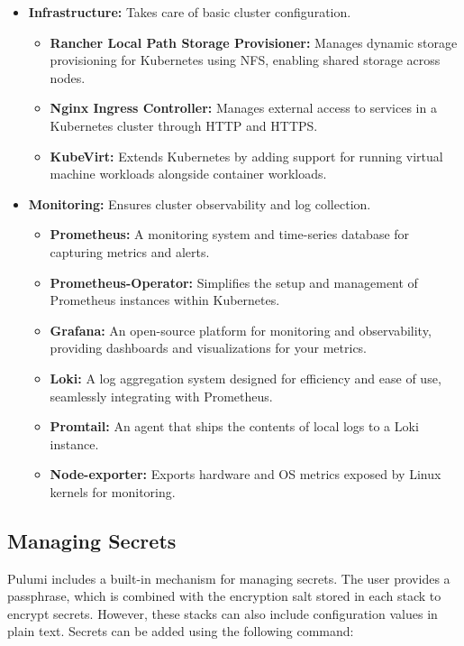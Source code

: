 \begin{itemize}
\begin{itemize}
    \end{itemize}
    \item \textbf{Infrastructure:} Takes care of basic cluster configuration.
    \begin{itemize}
        \item \textbf{Rancher Local Path Storage Provisioner:} Manages dynamic storage provisioning for Kubernetes using NFS, enabling shared storage across nodes.
        \item \textbf{Nginx Ingress Controller:} Manages external access to services in a Kubernetes cluster through HTTP and HTTPS.
        \item \textbf{KubeVirt:} Extends Kubernetes by adding support for running virtual machine workloads alongside container workloads.
    \end{itemize}
    \item \textbf{Monitoring:} Ensures cluster observability and log collection.
    \begin{itemize}
        \item \textbf{Prometheus:} A monitoring system and time-series database for capturing metrics and alerts.
        \item \textbf{Prometheus-Operator:} Simplifies the setup and management of Prometheus instances within Kubernetes.
        \item \textbf{Grafana:} An open-source platform for monitoring and observability, providing dashboards and visualizations for your metrics.
        \item \textbf{Loki:} A log aggregation system designed for efficiency and ease of use, seamlessly integrating with Prometheus.
        \item \textbf{Promtail:} An agent that ships the contents of local logs to a Loki instance.
        \item \textbf{Node-exporter:} Exports hardware and OS metrics exposed by Linux kernels for monitoring.
    \end{itemize}
\end{itemize}

\subsection{Managing Secrets}
Pulumi includes a built-in mechanism for managing secrets. The user provides a passphrase, which is combined with the encryption salt stored in each stack to encrypt secrets. However, these stacks can also include configuration values in plain text. Secrets can be added using the following command:

